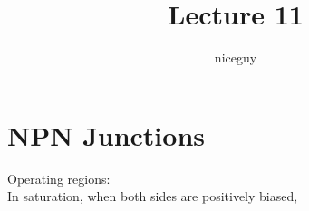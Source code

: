 \documentclass[12pt]{article}
\title{Lecture 11}
\author{niceguy}
\begin{document}
\maketitle

\section{NPN Junctions}

Operating regions: \\
In saturation, when both sides are positively biased,
\end{document}
